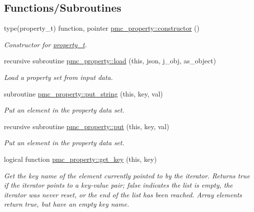 \subsection*{Functions/\+Subroutines}
\begin{DoxyCompactItemize}
\item 
type(property\+\_\+t) function, pointer \mbox{\hyperlink{namespacepmc__property_ac1691fe0d2b767ab79cb3d3e95e9ddba}{pmc\+\_\+property\+::constructor}} ()
\begin{DoxyCompactList}\small\item\em Constructor for \mbox{\hyperlink{structpmc__property_1_1property__t}{property\+\_\+t}}. \end{DoxyCompactList}\item 
recursive subroutine \mbox{\hyperlink{namespacepmc__property_ad1b94310c9bc21b189955b8ceec4918a}{pmc\+\_\+property\+::load}} (this, json, j\+\_\+obj, as\+\_\+object)
\begin{DoxyCompactList}\small\item\em Load a property set from input data. \end{DoxyCompactList}\item 
subroutine \mbox{\hyperlink{namespacepmc__property_a849e58df17633b82032774d0ee63d3c8}{pmc\+\_\+property\+::put\+\_\+string}} (this, key, val)
\begin{DoxyCompactList}\small\item\em Put an element in the property data set. \end{DoxyCompactList}\item 
recursive subroutine \mbox{\hyperlink{namespacepmc__property_a40b196afb48588fb6286649ae31b97b6}{pmc\+\_\+property\+::put}} (this, key, val)
\begin{DoxyCompactList}\small\item\em Put an element in the property data set. \end{DoxyCompactList}\item 
logical function \mbox{\hyperlink{namespacepmc__property_a7556849d2f132cb4b347a8840ee8434e}{pmc\+\_\+property\+::get\+\_\+key}} (this, key)
\begin{DoxyCompactList}\small\item\em Get the key name of the element currently pointed to by the iterator. Returns true if the iterator points to a key-\/value pair; false indicates the list is empty, the iterator was never reset, or the end of the list has been reached. Array elements return true, but have an empty key name. \end{DoxyCompactList}\item 

\end{DoxyCompactItemize}
